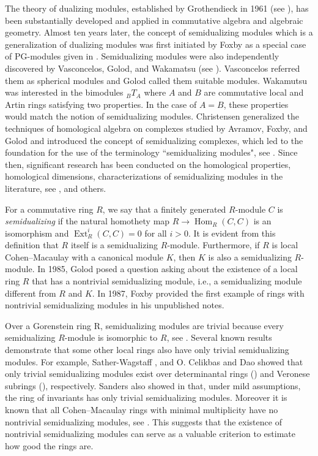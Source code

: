 \documentclass{amsart}
\DeclareMathOperator{\Hom}{Hom}
\DeclareMathOperator{\Ext}{Ext}
\theoremstyle{plain}
\theoremstyle{definition}
\numberwithin{theorem}{section}
\numberwithin{equation}{section}
\numberwithin{equation}{theorem}
\begin{document}
The theory of dualizing modules, established by Grothendieck in 1961 (see \cite{Ha}), has been substantially developed and applied in commutative algebra and algebraic geometry. 
Almost ten years later, the concept of semidualizing modules which is a generalization of dualizing modules was first initiated by Foxby as a special case of PG-modules given in \cite{F72}. Semidualizing modules were also independently discovered by Vasconcelos, Golod, and Wakamatsu (see \cite{G84, V74, W88}). Vasconcelos referred them as spherical modules and Golod called them suitable modules. Wakamutsu was interested in the bimodules ${}_{B} T_{A}$ where $A$ and $B$ are commutative local and Artin rings satisfying two properties. In the case of $A=B$, these properties would match the notion of semidualizing modules. Christensen generalized the techniques of homological algebra on complexes studied by Avramov, Foxby, and Golod and introduced the concept of semidualizing complexes, which led to the foundation for the use of the terminology ``semidualizing modules", see \cite{C}. Since then, significant research has been conducted on the homological properties, homological dimensions, characterizations of semidualizing modules in the literature, see \cite{A, CSW, FSW1, FSW2, Ger1, Ger2, HJ, NSW, SW07, TW}, and others. 

For a commutative ring $R$, we say that a finitely generated $R$-module $C$ is \textit{semidualizing} if the natural homothety map $R \rightarrow \Hom_R(C, C)$ is an isomorphism and $\Ext_R^i(C,C)=0$ for all $i>0$.
It is evident from this definition that $R$ itself is a semidualizing $R$-module.
Furthermore, if $R$ is local Cohen--Macaulay with a canonical module $K$, then $K$ is also a semidualizing $R$-module. In 1985, Golod \cite{G85} posed a question asking about the existence of a local ring $R$ that has a nontrivial semidualizing module, i.e., a semidualizing module different from $R$ and $K$. 
In 1987, Foxby provided the first example of rings with nontrivial semidualizing modules in his unpublished notes.


Over a Gorenstein ring R, semidualizing modules are trivial because every semidualizing $R$-module is isomorphic to $R$, see \cite[(8.6)]{C}. Several known results demonstrate that some other local rings also have only trivial semidualizing modules. For example, Sather-Wagstaff , and O. Celikbas and Dao showed that only trivial semidualizing modules exist over determinantal rings (\cite{SW07}) and Veronese subrings (\cite{CD}), respectively. Sanders also showed in \cite{S} that, under mild assumptions, the ring of invariants has only trivial semidualizing modules.
Moreover it is known that all Cohen--Macaulay rings with minimal multiplicity have no nontrivial semidualizing modules, see \cite[Example 4.2.14]{SW10}.
This suggests that the existence of nontrivial semidualizing modules can serve as a valuable criterion to estimate how good the rings are.
\end{document}
